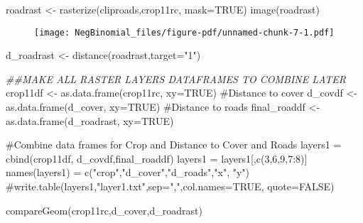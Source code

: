 \documentclass[
  letterpaper,
]{book}
\newenvironment{Shaded}{\begin{snugshade}}{\end{snugshade}}
\newcommand{\AttributeTok}[1]{\textcolor[rgb]{0.40,0.45,0.13}{#1}}
\newcommand{\CommentTok}[1]{\textcolor[rgb]{0.37,0.37,0.37}{#1}}
\newcommand{\ConstantTok}[1]{\textcolor[rgb]{0.56,0.35,0.01}{#1}}
\newcommand{\DecValTok}[1]{\textcolor[rgb]{0.68,0.00,0.00}{#1}}
\newcommand{\DocumentationTok}[1]{\textcolor[rgb]{0.37,0.37,0.37}{\textit{#1}}}
\newcommand{\FunctionTok}[1]{\textcolor[rgb]{0.28,0.35,0.67}{#1}}
\newcommand{\NormalTok}[1]{\textcolor[rgb]{0.00,0.23,0.31}{#1}}
\newcommand{\OtherTok}[1]{\textcolor[rgb]{0.00,0.23,0.31}{#1}}
\newcommand{\SpecialCharTok}[1]{\textcolor[rgb]{0.37,0.37,0.37}{#1}}
\newcommand{\StringTok}[1]{\textcolor[rgb]{0.13,0.47,0.30}{#1}}
\begin{document}
\begin{Shaded}
\begin{Highlighting}[]
\NormalTok{roadrast }\OtherTok{\textless{}{-}} \FunctionTok{rasterize}\NormalTok{(cliproads,crop11rc, }\AttributeTok{mask=}\ConstantTok{TRUE}\NormalTok{)}
\FunctionTok{image}\NormalTok{(roadrast)}
\end{Highlighting}
\end{Shaded}

\begin{figure}[H]

{\centering \texttt{[image: NegBinomial\_files/figure-pdf/unnamed-chunk-7-1.pdf]}

}

\end{figure}

\begin{Shaded}
\begin{Highlighting}[]
\NormalTok{d\_roadrast }\OtherTok{\textless{}{-}} \FunctionTok{distance}\NormalTok{(roadrast,}\AttributeTok{target=}\StringTok{"1"}\NormalTok{)}

\DocumentationTok{\#\#MAKE ALL RASTER LAYERS DATAFRAMES TO COMBINE LATER}
\NormalTok{crop11df }\OtherTok{\textless{}{-}} \FunctionTok{as.data.frame}\NormalTok{(crop11rc, }\AttributeTok{xy=}\ConstantTok{TRUE}\NormalTok{)}
\CommentTok{\#Distance to cover}
\NormalTok{d\_covdf }\OtherTok{\textless{}{-}} \FunctionTok{as.data.frame}\NormalTok{(d\_cover, }\AttributeTok{xy=}\ConstantTok{TRUE}\NormalTok{)}
\CommentTok{\#Distance to roads}
\NormalTok{final\_roaddf }\OtherTok{\textless{}{-}} \FunctionTok{as.data.frame}\NormalTok{(d\_roadrast, }\AttributeTok{xy=}\ConstantTok{TRUE}\NormalTok{)}

\CommentTok{\#Combine data frames for Crop and Distance to Cover and Roads}
\NormalTok{layers1 }\OtherTok{=} \FunctionTok{cbind}\NormalTok{(crop11df, d\_covdf,final\_roaddf)}
\NormalTok{layers1 }\OtherTok{=}\NormalTok{ layers1[,}\FunctionTok{c}\NormalTok{(}\DecValTok{3}\NormalTok{,}\DecValTok{6}\NormalTok{,}\DecValTok{9}\NormalTok{,}\DecValTok{7}\SpecialCharTok{:}\DecValTok{8}\NormalTok{)]}
\FunctionTok{names}\NormalTok{(layers1) }\OtherTok{=} \FunctionTok{c}\NormalTok{(}\StringTok{"crop"}\NormalTok{,}\StringTok{"d\_cover"}\NormalTok{,}\StringTok{"d\_roads"}\NormalTok{,}\StringTok{"x"}\NormalTok{, }\StringTok{"y"}\NormalTok{)}
\CommentTok{\#write.table(layers1,"layer1.txt",sep=",",col.names=TRUE, quote=FALSE)}

\FunctionTok{compareGeom}\NormalTok{(crop11rc,d\_cover,d\_roadrast)}
\end{Highlighting}
\end{Shaded}
\end{document}

